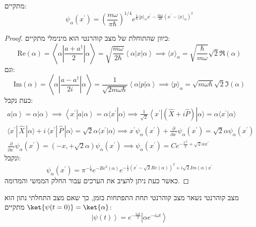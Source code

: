 \documentclass{tstextbook}
\begin{document}
\begin{proposition}
מתקיים:
$$\psi_{\alpha}\left( x^{\prime} \right)=\left( \frac{m\omega}{\pi\hbar} \right)^{1/4}e^{\frac{i}{\hbar}\langle p\rangle_{\alpha}x^{\prime}-\frac{m\omega}{2\hbar}\left( x^{\prime}-\langle x\rangle_{\alpha} \right)^{2}}$$

\end{proposition}
\begin{proof}
כיוון שהתוחלת של מצב קוהרנטי הוא מינימלי מתקיים:
$$\mathrm{Re}\left( \alpha \right)=\left\langle \alpha|\frac{a+a^{\dagger}}{2}|\alpha \right\rangle=\sqrt{\frac{m\omega}{2\hbar}}\left\langle \alpha|x|\alpha \right\rangle\implies \langle x\rangle_{\alpha}={\sqrt{\frac{\hbar}{m\omega}}}{\sqrt{2}}\Re\left( \alpha \right)$$
וגם:
$$\mathrm{Im}\left( \alpha \right)=\left\langle \alpha|\frac{a-a^{\dagger}}{2i}|\alpha \right\rangle=\frac{1}{\sqrt{2m\omega\hbar}}\left\langle \alpha|p|\alpha \right\rangle \implies \langle p\rangle_{\alpha}={\sqrt{m\omega\hbar}}\sqrt{2}\Im\left( \alpha \right)$$
כעת נקבל:
\begin{gather*}a\left|\alpha\right\rangle=\alpha\left|\alpha\right\rangle\implies\left\langle x^{\prime}\right|a\left|\alpha\right\rangle=\alpha\langle x^{\prime}|\alpha\rangle\implies{\frac{1}{\sqrt{2}}}\left\langle x^{\prime}\right|\left({\hat{X}}+i{\hat{P}}\right)|\alpha\rangle=\alpha\langle x^{\prime}|\alpha\rangle \\\langle x^{\prime}|\,\hat{X}\,|\alpha\rangle+i\,\langle x^{\prime}|\,\hat{P}\,|\alpha\rangle=\sqrt{2}\alpha\langle x^{\prime}|\alpha\rangle\implies x^{\prime}\psi_{\alpha}\left(x^{\prime}\right)+\frac{\partial}{\partial x^{\prime}}\psi_{\alpha}\left(x^{\prime}\right)=\sqrt{2}\alpha\psi_{\alpha}\left(x^{\prime}\right) \\\frac{\partial}{\partial x^{\prime}}\psi_{\alpha}\left(x^{\prime}\right)=\left(-x,+\sqrt{2}\alpha\right)\psi_{\alpha}\left(x^{\prime}\right)\implies\psi_{\alpha}\left(x^{\prime}\right)=C e^{-\frac{x^{\prime2}}{2}+\sqrt{2}\alpha x^{\prime}}
\end{gather*}
ונקבל:
$$\psi_{\alpha}\left(x^{\prime}\right)=\pi^{-\frac{1}{4}}e^{-R e^{2}\left(\alpha\right)}e^{-\frac{1}{2}\left(x^{\prime}-\sqrt{2}R e(\alpha)\right)^{2}+i\sqrt{2}I m(\alpha)x^{\prime}}$$
כאשר כעת ניתן להציב את הערכים עבור החלק הממשי והמדומה.

\end{proof}
\begin{proposition}
מצב קוהרנטי נשאר מצב קוהרנטי תחת התפתחות בזמן, כך שאם מצב התחלתי נתון הוא \(\ket{\psi(t=0)}=\ket{\alpha}\) מתקיים:
$$\left|\psi\left(t\right)\right\rangle=e^{-\frac{i\omega t}{2}}\left|\alpha e^{-i\omega t}\right\rangle$$

\end{proposition}
\end{document}
